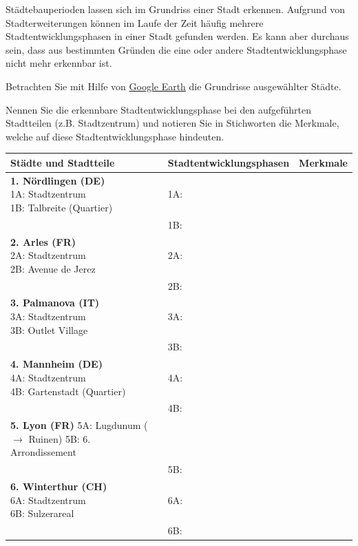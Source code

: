 \begin{myexercise}
Städtebauperioden lassen sich im Grundriss einer Stadt erkennen. Aufgrund von Stadterweiterungen können im Laufe der Zeit häufig mehrere Stadtentwicklungsphasen in einer Stadt gefunden werden. Es kann aber durchaus sein, dass aus bestimmten Gründen die eine oder andere Stadtentwicklungsphase nicht mehr erkennbar ist.

Betrachten Sie mit Hilfe von \href{https://www.google.com/earth}{Google Earth} die Grundrisse ausgewählter Städte.

Nennen Sie die erkennbare Stadtentwicklungsphase bei den aufgeführten Stadtteilen (z.B. Stadtzentrum) und notieren Sie in Stichworten die Merkmale, welche auf diese Stadtentwicklungsphase hindeuten.
\begin{table}[H]
\centering
\begin{tabular}{p{4.3cm}|p{3.7cm}|p{6cm}}
\textbf{Städte und Stadtteile} & \textbf{Stadtentwicklungsphasen} & \textbf{Merkmale} \\ \midrule\midrule
\makecell[l]{\textbf{1. Nördlingen (DE)}\\1A: Stadtzentrum\\
1B: Talbreite (Quartier)} & 1A: & \\ \cline{2-3}
& 1B: & \\ \midrule
\makecell[l]{\textbf{2. Arles (FR)}\\2A: Stadtzentrum\\
2B: Avenue de Jerez} & 2A: & \\ \cline{2-3}
& 2B: & \\ \midrule
\makecell[l]{\textbf{3. Palmanova (IT)}\\3A: Stadtzentrum\\
3B: Outlet Village} & 3A: &\\ \cline{2-3}
& 3B: & \\ \midrule
\makecell[l]{\textbf{4. Mannheim (DE)}\\4A: Stadtzentrum\\
4B: Gartenstadt (Quartier)} & 4A: & \\ \cline{2-3}
& 4B: & \\ \midrule
\makecell[l]{\textbf{5. Lyon (FR)}\\5A: Lugdunum ($\rightarrow$ Ruinen)\\5B: 6. Arrondissement} & & \\ \cline{2-3}
& 5B: & \\ \midrule
\makecell[l]{\textbf{6. Winterthur (CH)}\\6A: Stadtzentrum\\6B: Sulzerareal} & 6A: &\\ \cline{2-3}
& 6B: & \\
\end{tabular}
\end{table}


\end{myexercise}
